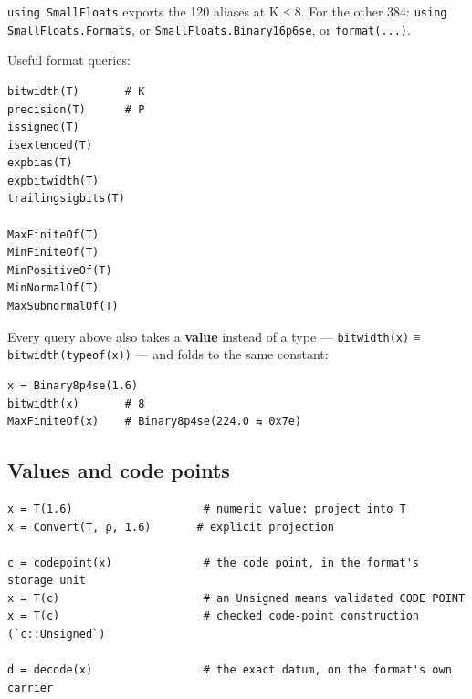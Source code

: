 \texttt{using SmallFloats} exports the 120 aliases at K ≤ 8. For the other 384: \texttt{using SmallFloats.Formats}, or \texttt{SmallFloats.Binary16p6se}, or \texttt{format(...)}.



Useful format queries:




\nopagebreak[4]
\begin{verbatim}
bitwidth(T)       # K
precision(T)      # P
issigned(T)
isextended(T)
expbias(T)
expbitwidth(T)
trailingsigbits(T)

MaxFiniteOf(T)
MinFiniteOf(T)
MinPositiveOf(T)
MinNormalOf(T)
MaxSubnormalOf(T)
\end{verbatim}



Every query above also takes a \textbf{value} instead of a type — \texttt{bitwidth(x)} ≡ \texttt{bitwidth(typeof(x))} — and folds to the same constant:




\nopagebreak[4]
\begin{verbatim}
x = Binary8p4se(1.6)
bitwidth(x)       # 8
MaxFiniteOf(x)    # Binary8p4se(224.0 ⇆ 0x7e)
\end{verbatim}



\subsection{Values and code points}



\label{1762024146591479678}{}



\begin{verbatim}
x = T(1.6)                    # numeric value: project into T
x = Convert(T, ρ, 1.6)       # explicit projection

c = codepoint(x)              # the code point, in the format's storage unit
x = T(c)                      # an Unsigned means validated CODE POINT
x = T(c)                      # checked code-point construction (`c::Unsigned`)

d = decode(x)                 # the exact datum, on the format's own carrier
\end{verbatim}



